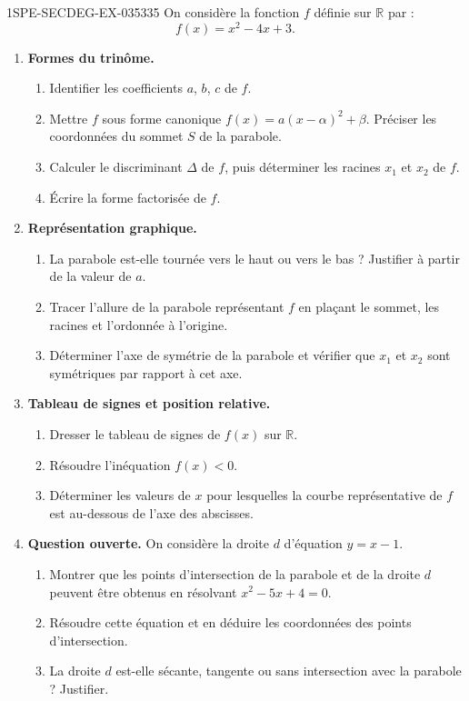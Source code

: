 \begin{exercice}{1SPE-SECDEG-EX-035}{3}{35}
On considère la fonction $f$ définie sur $\mathbb{R}$ par :
\[
  f(x) = x^2 - 4x + 3.
\]

\begin{enumerate}
  \item \textbf{Formes du trinôme.}
  \begin{enumerate}
    \item Identifier les coefficients $a$, $b$, $c$ de $f$.
    \item Mettre $f$ sous forme canonique $f(x) = a(x - \alpha)^2 + \beta$. Préciser les coordonnées du sommet $S$ de la parabole.
    \item Calculer le discriminant $\Delta$ de $f$, puis déterminer les racines $x_1$ et $x_2$ de $f$.
    \item Écrire la forme factorisée de $f$.
  \end{enumerate}

  \item \textbf{Représentation graphique.}
  \begin{enumerate}
    \item La parabole est-elle tournée vers le haut ou vers le bas ? Justifier à partir de la valeur de $a$.
    \item Tracer l'allure de la parabole représentant $f$ en plaçant le sommet, les racines et l'ordonnée à l'origine.
    \item Déterminer l'axe de symétrie de la parabole et vérifier que $x_1$ et $x_2$ sont symétriques par rapport à cet axe.
  \end{enumerate}

  \item \textbf{Tableau de signes et position relative.}
  \begin{enumerate}
    \item Dresser le tableau de signes de $f(x)$ sur $\mathbb{R}$.
    \item Résoudre l'inéquation $f(x) < 0$.
    \item Déterminer les valeurs de $x$ pour lesquelles la courbe représentative de $f$ est au-dessous de l'axe des abscisses.
  \end{enumerate}

  \item \textbf{Question ouverte.} On considère la droite $d$ d'équation $y = x - 1$.
  \begin{enumerate}
    \item Montrer que les points d'intersection de la parabole et de la droite $d$ peuvent être obtenus en résolvant $x^2 - 5x + 4 = 0$.
    \item Résoudre cette équation et en déduire les coordonnées des points d'intersection.
    \item La droite $d$ est-elle sécante, tangente ou sans intersection avec la parabole ? Justifier.
  \end{enumerate}
\end{enumerate}
\end{exercice}
